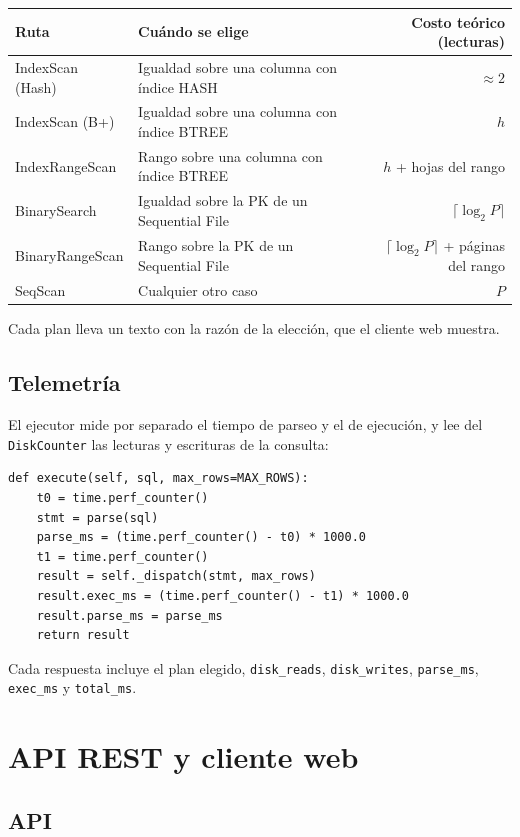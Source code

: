 \documentclass[11pt,a4paper]{article}
\newcommand{\code}[1]{\texttt{#1}}
\begin{document}
\begin{center}
\begin{tabularx}{\textwidth}{l Y r}
\toprule
Ruta & Cuándo se elige & Costo teórico (lecturas) \\
\midrule
IndexScan (Hash) & Igualdad sobre una columna con índice HASH & $\approx 2$ \\
IndexScan (B+) & Igualdad sobre una columna con índice BTREE & $h$ \\
IndexRangeScan & Rango sobre una columna con índice BTREE & $h$ + hojas del rango \\
BinarySearch & Igualdad sobre la PK de un Sequential File & $\lceil \log_2 P \rceil$ \\
BinaryRangeScan & Rango sobre la PK de un Sequential File & $\lceil \log_2 P \rceil$ + páginas del rango \\
SeqScan & Cualquier otro caso & $P$ \\
\bottomrule
\end{tabularx}
\end{center}

Cada plan lleva un texto con la razón de la elección, que el cliente web muestra.

\subsection{Telemetría}

El ejecutor mide por separado el tiempo de parseo y el de ejecución, y lee del
\code{DiskCounter} las lecturas y escrituras de la consulta:

\begin{lstlisting}
def execute(self, sql, max_rows=MAX_ROWS):
    t0 = time.perf_counter()
    stmt = parse(sql)
    parse_ms = (time.perf_counter() - t0) * 1000.0
    t1 = time.perf_counter()
    result = self._dispatch(stmt, max_rows)
    result.exec_ms = (time.perf_counter() - t1) * 1000.0
    result.parse_ms = parse_ms
    return result
\end{lstlisting}

Cada respuesta incluye el plan elegido, \code{disk\_reads}, \code{disk\_writes},
\code{parse\_ms}, \code{exec\_ms} y \code{total\_ms}.

\section{API REST y cliente web}

\subsection{API}
\end{document}
